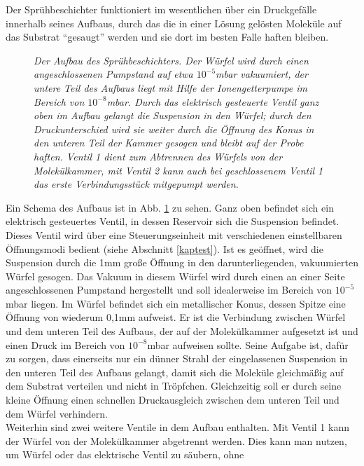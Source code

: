 Der Sprühbeschichter funktioniert im wesentlichen über ein Druckgefälle innerhalb seines Aufbaus, durch das
die in einer Lösung gelösten Moleküle auf das Substrat "`gesaugt"' werden und sie dort im besten
Falle haften bleiben. 
\begin{figure}[H]
\centering

\caption{\textit{Der Aufbau des Sprühbeschichters. 
Der Würfel wird durch einen angeschlossenen Pumpstand auf etwa $10^{-5}$mbar vakuumiert, der untere
Teil des Aufbaus liegt mit Hilfe der Ionengetterpumpe im Bereich von $10^{-8}$mbar. Durch das
elektrisch gesteuerte Ventil ganz oben im Aufbau gelangt die Suspension in den Würfel; durch den
Druckunterschied wird sie weiter durch die Öffnung des Konus in den unteren Teil der Kammer gesogen
und bleibt auf der Probe haften. Ventil 1 dient zum Abtrennen des Würfels von der Molekülkammer, mit
Ventil 2 kann auch bei geschlossenem Ventil 1 das erste Verbindungsstück mitgepumpt werden.
}}
\label{aufbau}
\end{figure}
Ein Schema des Aufbaus ist in Abb. \ref{aufbau} zu sehen. Ganz oben befindet sich ein elektrisch
gesteuertes Ventil, in dessen Reservoir sich die Suspension befindet. Dieses Ventil wird über eine
Steuerungseinheit mit verschiedenen einstellbaren Öffnungsmodi bedient (siehe Abschnitt \ref{kaptest}). Ist es
geöffnet, wird die Suspension durch die 1mm große Öffnung in den darunterliegenden, vakuumierten Würfel
gesogen. Das Vakuum in diesem Würfel wird durch einen an einer Seite angeschlossenen Pumpstand hergestellt
und soll idealerweise im Bereich von $10^{-5}$mbar liegen. Im Würfel befindet sich ein metallischer
Konus, dessen Spitze eine Öffnung von wiederum 0,1mm aufweist. Er ist die Verbindung zwischen Würfel und dem
unteren Teil des Aufbaus, der auf der Molekülkammer aufgesetzt ist und einen Druck im Bereich von
$10^{-8}$mbar aufweisen sollte.  
Seine Aufgabe ist, dafür zu sorgen, dass einerseits nur ein dünner Strahl der eingelassenen Suspension in
den unteren Teil des Aufbaus gelangt, damit sich die Moleküle gleichmäßig auf dem Substrat verteilen und
nicht in Tröpfchen. Gleichzeitig soll er durch seine kleine Öffnung einen schnellen Druckausgleich zwischen
dem unteren Teil und dem Würfel verhindern. \\
Weiterhin sind zwei weitere Ventile in dem Aufbau enthalten. Mit Ventil 1 kann der Würfel von der
Molekülkammer abgetrennt werden. Dies kann man nutzen, um Würfel oder das elektrische Ventil zu säubern, ohne
